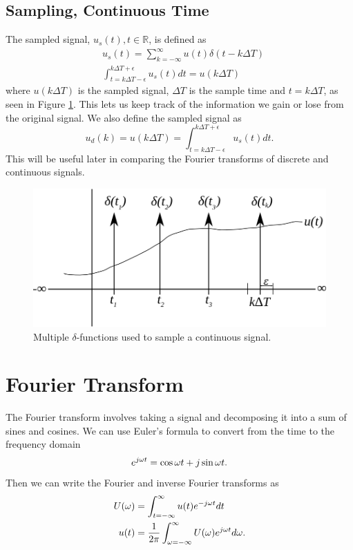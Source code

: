 \subsection{Sampling, Continuous Time}
The sampled signal, $u_s(t), t \in \mathbb{R}$, is defined as
\begin{align*}
&u_s(t) = \sum_{k=-\infty}^\infty u(t)\delta(t-k\Delta T) \\
&\int_{t=k\Delta T-\epsilon}^{k\Delta T+\epsilon} u_s(t)dt = u(k\Delta T)
\end{align*}
where $u(k\Delta T)$ is the sampled signal, $\Delta T$ is the sample time and $t=k\Delta T$, as seen in Figure \ref{fig:02samplingDeltaFn}. This lets us keep track of the information we gain or lose from the original signal. We also define the sampled signal as
$$u_d(k) = u(k\Delta T) = \int_{t=k\Delta T-\epsilon}^{k\Delta T+\epsilon} u_s(t)dt.$$
This will be useful later in comparing the Fourier transforms of discrete and continuous signals.
\begin{figure}[ht!]
	\centering
	\includegraphics[width=.4\textwidth]{images/02samplingDeltaFn}
	\caption{Multiple $\delta$-functions used to sample a continuous signal.}
	\label{fig:02samplingDeltaFn}
\end{figure}

\section{Fourier Transform}
The Fourier transform involves taking a signal and decomposing it into a sum of sines and cosines. We can use Euler's formula to convert from the time to the frequency domain
$$e^{j\omega t} = \cos\omega t + j\sin\omega t.$$
Then we can write the Fourier and inverse Fourier transforms as
\begin{align*}
U(\omega) &= \int_{t=-\infty}^\infty u(t)e^{-j\omega t}dt \\
u(t) &= \frac{1}{2\pi} \int_{\omega=-\infty}^\infty U(\omega)e^{j\omega t}d\omega.
\end{align*}

